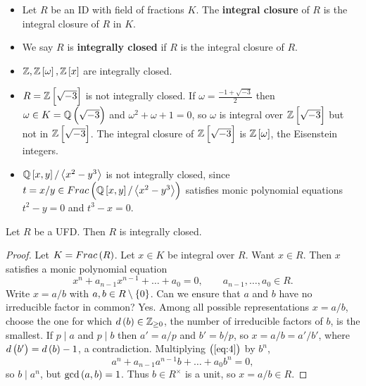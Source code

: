 \begin{definition}
\hfill
\begin{itemize}
\item Let $ R $ be an ID with field of fractions $ K $. The \textbf{integral closure} of $ R $ is the integral closure of $ R $ in $ K $.
\item We say $ R $ is \textbf{integrally closed} if $ R $ is the integral closure of $ R $.
\end{itemize}
\end{definition}

\begin{example*}
\hfill
\begin{itemize}
\item $ \Z, \Z\sbr{\omega}, \Z\sbr{x} $ are integrally closed.
\item $ R = \Z\sbr{\sqrt{-3}} $ is not integrally closed. If $ \omega = \tfrac{-1 + \sqrt{-3}}{2} $ then $ \omega \in K = \Q\br{\sqrt{-3}} $ and $ \omega^2 + \omega + 1 = 0 $, so $ \omega $ is integral over $ \Z\sbr{\sqrt{-3}} $ but not in $ \Z\sbr{\sqrt{-3}} $. The integral closure of $ \Z\sbr{\sqrt{-3}} $ is $ \Z\sbr{\omega} $, the Eisenstein integers.
\item $ \Q\sbr{x, y} / \abr{x^2 - y^3} $ is not integrally closed, since $ t = x / y \in Frac\br{\Q\sbr{x, y} / \abr{x^2 - y^3}} $ satisfies monic polynomial equations $ t^2 - y = 0 $ and $ t^3 - x = 0 $.
\end{itemize}
\end{example*}


\begin{proposition}
Let $ R $ be a UFD. Then $ R $ is integrally closed.
\end{proposition}

\begin{proof}
Let $ K = Frac\br{R} $. Let $ x \in K $ be integral over $ R $. Want $ x \in R $. Then $ x $ satisfies a monic polynomial equation
\begin{equation}
\label{eq:4}
x^n + a_{n - 1}x^{n - 1} + \dots + a_0 = 0, \qquad a_{n - 1}, \dots, a_0 \in R.
\end{equation}
Write $ x = a / b $ with $ a, b \in R \setminus \cbr{0} $. Can we ensure that $ a $ and $ b $ have no irreducible factor in common? Yes. Among all possible representations $ x = a / b $, choose the one for which $ d\br{b} \in \Z_{\ge 0} $, the number of irreducible factors of $ b $, is the smallest. If $ p \mid a $ and $ p \mid b $ then $ a' = a / p $ and $ b' = b / p $, so $ x = a / b = a' / b' $, where $ d\br{b'} = d\br{b} - 1 $, a contradiction. Multiplying $ \br{\ref{eq:4}} $ by $ b^n $,
$$ a^n + a_{n - 1}a^{n - 1}b + \dots + a_0b^n = 0, $$
so $ b \mid a^n $, but $ \gcd\br{a, b} = 1 $. Thus $ b \in R^\times $ is a unit, so $ x = a / b \in R $.
\end{proof}

